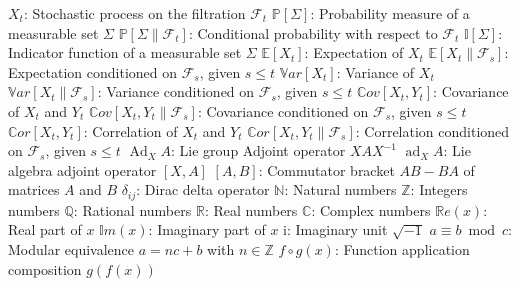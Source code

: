 \begin{tabbing}
	\addsymbol \mbox{$X_t$}: {Stochastic process on the filtration $\mathscr{F}_t$}
	\addsymbol \mbox{$\mathbb{P}\left[\Sigma \right]$}: {Probability measure of a measurable set $\Sigma$}
	\addsymbol \mbox{$\mathbb{P}\left[\Sigma \parallel \mathscr{F}_t \right]$}: {Conditional probability with respect to $\mathscr{F}_t$}
	\addsymbol \mbox{$\mathbb{I}\left[\Sigma\right]$}: {Indicator function of a measurable set $\Sigma$}
	\addsymbol \mbox{$\mathbb{E}\left[X_t\right]$}: {Expectation of $X_t$}
	\addsymbol \mbox{$\mathbb{E}\left[X_t \parallel \mathscr{F}_s\right]$}: {Expectation conditioned on $\mathscr{F}_s$, given $s \leq t$}
	\addsymbol \mbox{$\mathbb{V}ar\left[X_t\right]$}: {Variance of $X_t$}
	\addsymbol \mbox{$\mathbb{V}ar\left[X_t \parallel \mathscr{F}_s\right]$}: {Variance  conditioned on $\mathscr{F}_s$, given $s \leq t$}
	\addsymbol \mbox{$\mathbb{C}ov\left[X_t, Y_t\right]$}: {Covariance of $X_t$ and $Y_t$}
	\addsymbol \mbox{$\mathbb{C}ov\left[X_t, Y_t \parallel \mathscr{F}_s\right]$}: {Covariance  conditioned on $\mathscr{F}_s$, given $s \leq t$}
	\addsymbol \mbox{$\mathbb{C}or\left[X_t, Y_t\right]$}: {Correlation of $X_t$ and $Y_t$}
	\addsymbol \mbox{$\mathbb{C}or\left[X_t, Y_t \parallel \mathscr{F}_s\right]$}: {Correlation  conditioned on $\mathscr{F}_s$, given $s \leq t$}
	\addsymbol \mbox{$\operatorname{Ad}_X A$}: {Lie group Adjoint operator $XAX^{-1}$}
	\addsymbol \mbox{$\operatorname{ad}_X A$}: {Lie algebra adjoint operator $\left[X,A\right]$}
	\addsymbol \mbox{$\left[A,B\right]$}: {Commutator bracket $AB - BA$ of matrices $A$ and $B$}
	\addsymbol \mbox{$\delta_{ij}$}: {Dirac delta operator}
	\addsymbol \mbox{$\mathbb{N}$}: {Natural numbers}
	\addsymbol \mbox{$\mathbb{Z}$}: {Integers numbers}
	\addsymbol \mbox{$\mathbb{Q}$}: {Rational numbers}
	\addsymbol \mbox{$\mathbb{R}$}: {Real numbers}
	\addsymbol \mbox{$\mathbb{C}$}: {Complex numbers}
	\addsymbol \mbox{$\mathbb{R}e\left(x\right)$}: {Real part of $x$}
	\addsymbol \mbox{$\mathbb{I}m\left(x\right)$}: {Imaginary part of $x$}
	\addsymbol \mbox{$\mathrm{i}$}: {Imaginary unit $\sqrt{-1}$}
	\addsymbol \mbox{$a \equiv b \bmod c$}: {Modular equivalence $a = nc + b$ with $n \in \mathbb{Z}$}
	\addsymbol \mbox{$f \circ g \left(x\right)$}: {Function application composition $g\left(f\left(x\right)\right)$}
\end{tabbing}